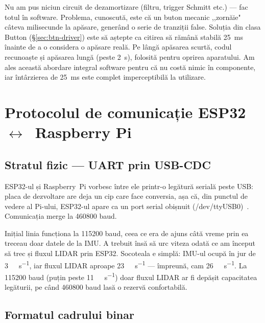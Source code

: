 \documentclass[a4paper,12pt,twoside,openany]{report}
\renewcommand{\texttt}[1]{\textnormal{#1}}
\begin{document}
Nu am pus niciun circuit de dezamortizare (filtru, trigger Schmitt etc.) —
fac totul în software. Problema, cunoscută, este că un buton mecanic
,,zornăie" câteva milisecunde la apăsare, generând o serie de tranziții false.
Soluția din clasa \texttt{Button} (§\ref{sec:btn-driver}) este să aștepte ca
citirea să rămână stabilă \SI{25}{\milli\second} înainte de a o considera o
apăsare reală. Pe lângă apăsarea scurtă, codul recunoaște și apăsarea lungă
(peste \SI{2}{\second}), folosită pentru oprirea aparatului. Am ales această
abordare integral software pentru că nu costă nimic în componente, iar
întârzierea de \SI{25}{\milli\second} este complet imperceptibilă la
utilizare.

\clearpage

\chapter{Protocolul de comunicație ESP32~\texorpdfstring{$\leftrightarrow$}{<->}~Raspberry Pi}
\label{cap:uart}

\section{Stratul fizic — UART prin USB-CDC}
\label{sec:uart-phy}

ESP32-ul și Raspberry~Pi vorbesc între ele printr-o legătură serială peste
USB: placa de dezvoltare are deja un cip care face conversia, așa că, din
punctul de vedere al Pi-ului, ESP32-ul apare ca un port serial obișnuit
(\texttt{/dev/ttyUSB0})~\cite{usbcdc}. Comunicația merge la \SI{460800}{} baud.

Inițial linia funcționa la \SI{115200}{} baud, ceea ce era de ajuns câtă vreme
prin ea treceau doar datele de la IMU. A trebuit însă să urc viteza odată ce am
început să trec și fluxul LIDAR prin ESP32. Socoteala e simplă: IMU-ul ocupă în
jur de \SI{3}{\kilo\byte\per\second}, iar fluxul LIDAR aproape
\SI{23}{\kilo\byte\per\second} — împreună, cam \SI{26}{\kilo\byte\per\second}.
La \SI{115200}{} baud (puțin peste \SI{11}{\kilo\byte\per\second}) doar fluxul
LIDAR ar fi depășit capacitatea legăturii, pe când \SI{460800}{} baud lasă o
rezervă confortabilă.

\section{Formatul cadrului binar}
\label{sec:frame-format}
\end{document}
